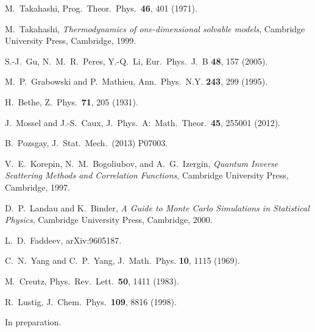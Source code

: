 \documentclass[twocolumn,superscriptaddress,prb,10pt]{revtex4-1}
\begin{document}
\begin{thebibliography}{99}
M.~Takahashi, Prog.\ Theor.\ Phys.\ {\bf 46}, 401 (1971). 

M.~Takahashi, {\it Thermodynamics of one-dimensional solvable models}, 
Cambridge University Press, Cambridge, 1999. 

S.-J.~Gu, N.~M.~R.~Peres, Y.-Q.~Li, Eur.\ Phys.\ J.\ B {\bf 48}, 157 (2005). 

M.~P.~Grabowski and P.~Mathieu, Ann.\ Phys.\ N.Y. {\bf 243}, 
299 (1995). 

H.~Bethe, Z.\ Phys.\ {\bf 71}, 205 (1931). 

J.~Mossel and J.-S.~Caux, J.\ Phys.\ A:\ Math.\ Theor.\ {\bf 45}, 
255001 (2012). 


B.~Pozsgay, J.\ Stat.\ Mech.\ (2013) P07003. 

V.~E.~Korepin, N.~M.~Bogoliubov, and A.~G.~Izergin, \emph{Quantum 
Inverse Scattering Methods and Correlation Functions}, Cambridge 
University Press, Cambridge, 1997. 

D.~P.~Landau and K.~Binder, \emph{A Guide to Monte Carlo Simulations in 
Statistical Physics}, Cambridge University Press, Cambridge, 2000.

L.~D.~Faddeev, arXiv:9605187.

C.~N.~Yang and C.~P.~Yang, J.\ Math.\ Phys. {\bf 10}, 1115 (1969).

M.~Creutz, Phys.\ Rev.\ Lett.\ {\bf 50}, 1411 (1983).

R.~Lustig, J.\ Chem.\ Phys.\ {\bf 109}, 8816 (1998).

In preparation. 



\end{thebibliography}
\end{document}
